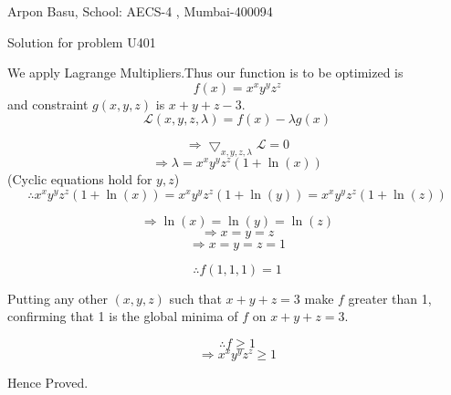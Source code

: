 \documentclass[10pt,a4paper]{extarticle}
\begin{document}
\begin{center}


Arpon Basu, School: AECS-4 , Mumbai-400094

Solution for problem U401
\end{center}

We apply Lagrange Multipliers.Thus our function is to be optimized is $$f(x)=x^xy^yz^z  $$ and constraint $g(x,y,z)  $ is $ x+y+z-3. $ \\




$$ \mathcal{L}(x,y,z,\lambda)=f(x)-\lambda g(x) $$

$$ \Rightarrow \bigtriangledown_{x,y,z,\lambda}\mathcal{L}=0 $$
$$ \Rightarrow \lambda =x^xy^yz^z(1+\ln(x))  $$ 
(Cyclic equations hold for $y , z$)
$$ \therefore x^xy^yz^z(1+\ln(x))=x^xy^yz^z(1+\ln(y))=x^xy^yz^z(1+\ln(z))$$



 $$ \Rightarrow \ln(x)=\ln(y)=\ln(z) $$
 $$ \Rightarrow x=y=z $$
$$ \Rightarrow x=y=z=1 $$

$$ \therefore f(1,1,1)=1 $$

Putting any other $(x,y,z)$ such that $x+y+z=3$ make $f$ greater than 1, confirming that 1 is the global minima of $f$ on $x+y+z=3.$

$$ \therefore f \ge 1 $$
$$ \Rightarrow x^xy^yz^z \ge 1 $$

Hence Proved.
\end{document}
